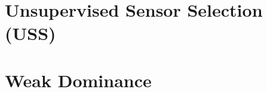 \documentclass[10pt]{article}
\begin{document}
%

%



%

%

\section{Unsupervised Sensor Selection (USS)}
\label{sec:Setup}


\section{Weak Dominance}
\label{sec:Learnability}

\end{document}
